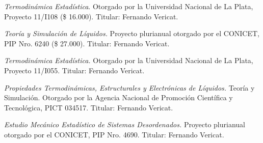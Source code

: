 \begin{timeline}
 \textit{Termodinámica Estadística}. Otorgado por la Universidad Nacional de La Plata, Proyecto 11/I108 (\$ 16.000). Titular: Fernando Vericat.

 \textit{Teoría y Simulación de Líquidos.} Proyecto plurianual otorgado por el CONICET, PIP Nro. 6240 (\$ 27.000). Titular: Fernando Vericat.

 \textit{Termodinámica Estadística.} Otorgado por la Universidad Nacional de La Plata, Proyecto 11/I055. Titular: Fernando Vericat.

 \textit{Propiedades Termodinámicas, Estructurales y Electrónicas de Líquidos.} Teoría y Simulación. Otorgado por la Agencia Nacional de Promoción Científica y Tecnológica, PICT 034517. Titular: Fernando Vericat.

 \textit{Estudio Mecánico Estadístico de Sistemas Desordenados.} Proyecto plurianual otorgado por el CONICET, PIP Nro. 4690. Titular: Fernando Vericat.
\end{timeline}